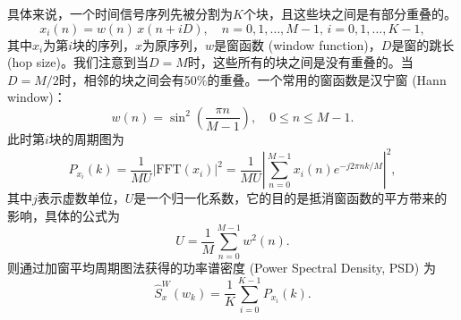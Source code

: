 具体来说，一个时间信号序列先被分割为$K$个块，且这些块之间是有部分重叠的。
\begin{equation}
  x_i(n) = w(n) \, x(n+i D), \quad n=0,1, \ldots, M-1, \, i=0,1, \ldots, K-1,
\end{equation}
其中$x_i$为第$i$块的序列，$x$为原序列，$w$是窗函数 (window function)，$D$是窗的跳长 (hop size)。我们注意到当$D=M$时，这些所有的块之间是没有重叠的。当$D=M/2$时，相邻的块之间会有50\%的重叠。一个常用的窗函数是汉宁窗 (Hann window)：
\begin{equation}
  w(n)=\sin^2 \left(\frac{\pi n}{M-1}\right), \quad 0 \leq n \leq M-1 .
\end{equation}
此时第$i$块的周期图为
\begin{equation}
  P_{x_i}\left(k\right)=\frac{1}{MU}\left|\mathrm{FFT}\left(x_i\right)\right|^2 = \frac{1}{MU}\left|\sum_{n=0}^{M-1} x_i(n) e^{-j 2 \pi n k / M}\right|^2,
\end{equation}
其中$j$表示虚数单位，$U$是一个归一化系数，它的目的是抵消窗函数的平方带来的影响，具体的公式为
\begin{equation}
  U=\frac{1}{M}\sum^{M-1}_{n=0} w^2(n).
\end{equation}
则通过加窗平均周期图法获得的功率谱密度 (Power Spectral Density, PSD) 为
\begin{equation}
  \hat{S}_x^W\left(w_k\right) = \frac{1}{K} \sum_{i=0}^{K-1} P_{x_i}\left(k\right).
\end{equation}